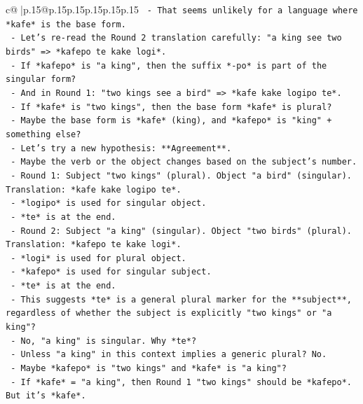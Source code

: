 \documentclass{article}
\begin{document}
{\begin{supertabular}{c@{$\;$}|p{.15\linewidth}@{}p{.15\linewidth}p{.15\linewidth}p{.15\linewidth}p{.15\linewidth}p{.15\linewidth}}
{{{\texttt{              {-} That seems unlikely for a language where *kafe* is the base form.} \\
\texttt{              {-} Let's re{-}read the Round 2 translation carefully: "a king see two birds" => *kafepo te kake logi*.} \\
\texttt{              {-} If *kafepo* is "a king", then the suffix *{-}po* is part of the singular form?} \\
\texttt{              {-} And in Round 1: "two kings see a bird" => *kafe kake logipo te*.} \\
\texttt{              {-} If *kafe* is "two kings", then the base form *kafe* is plural?} \\
\texttt{              {-} Maybe the base form is *kafe* (king), and *kafepo* is "king" + something else?} \\
\texttt{              {-} Let's try a new hypothesis: **Agreement**.} \\
\texttt{              {-} Maybe the verb or the object changes based on the subject's number.} \\
\texttt{              {-} Round 1: Subject "two kings" (plural). Object "a bird" (singular). Translation: *kafe kake logipo te*.} \\
\texttt{                {-} *logipo* is used for singular object.} \\
\texttt{                {-} *te* is at the end.} \\
\texttt{              {-} Round 2: Subject "a king" (singular). Object "two birds" (plural). Translation: *kafepo te kake logi*.} \\
\texttt{                {-} *logi* is used for plural object.} \\
\texttt{                {-} *kafepo* is used for singular subject.} \\
\texttt{                {-} *te* is at the end.} \\
\texttt{              {-} This suggests *te* is a general plural marker for the **subject**, regardless of whether the subject is explicitly "two kings" or "a king"?} \\
\texttt{                {-} No, "a king" is singular. Why *te*?} \\
\texttt{                {-} Unless "a king" in this context implies a generic plural? No.} \\
\texttt{                {-} Maybe *kafepo* is "two kings" and *kafe* is "a king"?} \\
\texttt{                  {-} If *kafe* = "a king", then Round 1 "two kings" should be *kafepo*. But it's *kafe*.} \\
}}}
\end{supertabular}}
\end{document}

